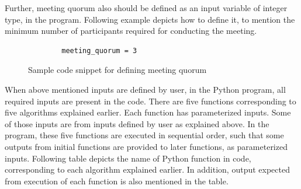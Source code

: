 Further, meeting quorum also should be defined as an input variable of integer type, in the program. Following example depicts how to define it, to mention the minimum number of participants required for conducting the meeting.\\ 
\begin{figure}[H]  
    \centering
    \begin{verbatim}
        meeting_quorum = 3
    \end{verbatim}
    \caption{Sample code snippet for defining meeting quorum}
    \label{fig:sample code snippet for defining meeting quorum}
\end{figure}    

When above mentioned inputs are defined by user, in the Python program, all required inputs are present in the code. There are five functions corresponding to five algorithms explained earlier. Each function has parameterized inputs. Some of those inputs are from inputs defined by user as explained above. In the program, these five functions are executed in sequential order, such that some outputs from initial functions are provided to later functions, as parameterized inputs. Following table depicts the name of Python function in code, corresponding to each algorithm explained earlier. In addition, output expected from execution of each function is also mentioned in the table.\\ 

